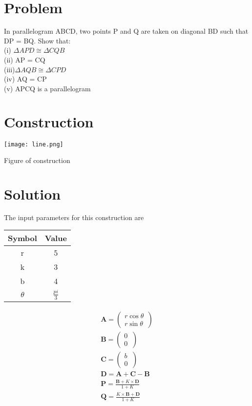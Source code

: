 \documentclass[10pt, a4paper]{article}
\title{\mytitle}
\author{\myauthor\hspace{1em}\\\contact\\FWC22011\hspace{6.5em}IITH\hspace{0.5em}\mymodule\hspace{6em}Matrix:Line}
\date{}
\let\vec\mathbf
\begin{document}
	\maketitle
	\tableofcontents
   \section{Problem}
In parallelogram ABCD, two points P and Q are
taken on diagonal BD such that DP = BQ. Show that: \\
(i) $\Delta APD \cong \Delta CQB$  \\       
(ii) AP = CQ\\
(iii)$\Delta AQB \cong \Delta CPD$  \\   
(iv) AQ = CP   \\
(v) APCQ is a parallelogram \\

\section{Construction}
  \texttt{[image: line.png]}
  	\begin{center}
  Figure of construction
  	\end{center}

   
  \section{Solution}
\begin{center}
The input parameters for this construction are
\begin{tabular}{|c|c|}
	\hline
	\textbf{Symbol}&\textbf{Value}\\
	\hline
	r&5\\
	\hline
	k&3\\
	\hline
    b&4\\
	\hline
	$\theta$&$\frac{pi}{3}$\\
	\hline
\end{tabular}
\end{center}

\begin{align*}
\vec{A}=\begin{pmatrix} r\cos\theta\\ r\sin\theta\ \end{pmatrix} \\
\vec{B}=\begin{pmatrix} 0\\ 0\ \end{pmatrix} \\
\vec{C}=\begin{pmatrix} b\\ 0\ \end{pmatrix} \\
\vec{D}={\vec{A}+\vec{C}-\vec{B}} \\
\vec{P} =  \frac{\vec{B} +K\times \vec{D}}{1+K} \\
\vec{Q} =  \frac{K\times\vec{B} +\vec{D}}{1+K} \\ 
\end{align*}
\end{document}
